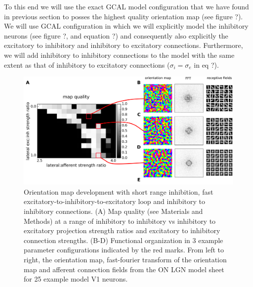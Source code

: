 \documentclass[a4paper,10pt]{article}
\begin{document}
To this end we will use the exact GCAL model configuration that we have found in previous section to posses the highest
quality orientation map (see figure ?). We will use GCAL configuration in which we will explicitly model the inhibitory neurons
(see figure ?, and equation ?) and consequently also explicitly the excitatory to inhibitory and inhibitory to excitatory connections.
Furthermore, we will add inhibitory to inhibitory connections to the model with the same extent as that of inhibitory to excitatory
connections ($\sigma_{i} = \sigma_{e}$ in eq ?). 

\begin{figure}[htpb!] 
\centering
\includegraphics[width=16cm]{./SVG/Figure2/figure2.png}
\caption{Orientation map development with short range inhibition, fast excitatory-to-inhibitory-to-excitatory loop and inhibitory to inhibitory connections. (A) Map quality (see Materials and Methods) at a range of 
inhibitory to inhibitory vs inhibitory to excitatory projection strength ratios and excitatory to inhibitory connection strengths. (B-D) Functional organization in 3 example parameter configurations 
indicated by the red marks. From left to right, the orientation map, fast-fourier transform of the orientation map and afferent connection fields from the ON LGN model sheet for 25 example model V1 neurons. }
\label{fig:figure2}
\end{figure} 
\end{document}
